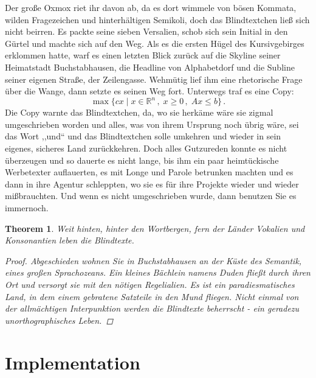 \documentclass[12pt,a4paper,twoside]{scrartcl}
\newtheorem{theorem}{Theorem}[section]
\numberwithin{equation}{section}
\begin{document}
Der große Oxmox riet ihr davon ab, da es dort wimmele von bösen Kommata, wilden Fragezeichen und hinterhältigen Semikoli, doch das Blindtextchen ließ sich nicht beirren. Es packte seine sieben Versalien, schob sich sein Initial in den Gürtel und machte sich auf den Weg. Als es die ersten Hügel des Kursivgebirges erklommen hatte, warf es einen letzten Blick zurück auf die Skyline seiner Heimatstadt Buchstabhausen, die Headline von Alphabetdorf und die Subline seiner eigenen Straße, der Zeilengasse. Wehmütig lief ihm eine rhetorische Frage über die Wange, dann setzte es seinen Weg fort. Unterwegs traf es eine Copy:
$$\max \{ c x \mid x \in \mathbb{R}^n \,,\; x \geq 0 \,,\; A x \leq b \} \,.$$
Die Copy warnte das Blindtextchen, da, wo sie herkäme wäre sie zigmal umgeschrieben worden und alles, was von ihrem Ursprung noch übrig wäre, sei das Wort ,,und`` und das Blindtextchen solle umkehren und wieder in sein eigenes, sicheres Land zurückkehren. Doch alles Gutzureden konnte es nicht überzeugen und so dauerte es nicht lange, bis ihm ein paar heimtückische Werbetexter auflauerten, es mit Longe und Parole betrunken machten und es dann in ihre Agentur schleppten, wo sie es für ihre Projekte wieder und wieder mißbrauchten. Und wenn es nicht umgeschrieben wurde, dann benutzen Sie es immernoch.
\begin{theorem}\label{thm:blind}
Weit hinten, hinter den Wortbergen, fern der Länder Vokalien und Konsonantien leben die Blindtexte.
\begin{proof}
Abgeschieden wohnen Sie in Buchstabhausen an der Küste des Semantik, eines großen Sprachozeans. Ein kleines Bächlein namens Duden fließt durch ihren Ort und versorgt sie mit den nötigen Regelialien. Es ist ein paradiesmatisches Land, in dem einem gebratene Satzteile in den Mund fliegen. Nicht einmal von der allmächtigen Interpunktion werden die Blindtexte beherrscht - ein geradezu unorthographisches Leben.
\end{proof}
\end{theorem}


\section{Implementation}
\end{document}
